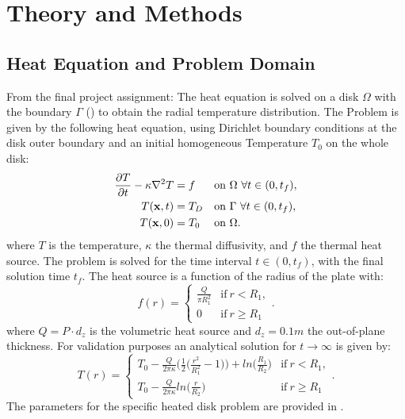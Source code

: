\section{Theory and Methods}

\subsection{Heat Equation and Problem Domain}

From the final project assignment:
The heat equation is solved on a disk $\Omega$ with the boundary $\Gamma$ () to obtain the radial temperature distribution. The Problem is given by the following heat equation, using Dirichlet boundary conditions at the disk outer boundary and an initial homogeneous Temperature $T_0$ on the whole disk:
\begin{align}
	\label{eq:Heat}
	\pp{T}{t}-\kappa \nabla^2 T &= f &&\text{on} \ \Omega \ \forall t \in (0,t_f),\\
	T(\vect{x},t) &= T_D &&\text{on} \ \Gamma \ \forall t \in (0,t_f), \label{eq:Dirichlet}\\
	T(\vect{x},0) &= T_0 &&\text{on} \ \Omega.
\end{align}
where $T$ is the temperature, $\kappa$ the thermal diffusivity, and $f$ the thermal heat source. The problem is solved for the time interval $t \in (0,t_f)$, with the final solution time $t_f$. The heat source is a function of the radius of the plate with:
\begin{equation}
	f(r) = \left\{\begin{array}{ll}\frac{Q}{\pi R_1^2} & \text{if} \ r < R_1, \\
		0 & \text{if} \ r \geq R_1 \end{array}\right . .
\end{equation}
where $Q=P \cdot d_z$ is the volumetric heat source and $d_z = 0.1m $ the out-of-plane thickness. For validation purposes an analytical solution for $t \rightarrow \infty$ is given by:
\begin{equation}
	\label{eq:analytical}
	T(r) = \left\{\begin{array}{ll} T_0-\frac{Q}{2 \pi \kappa } \big(\frac{1}{2} \big(\frac{r^2}{R_1^2} - 1\big)\big)+ln\big(\frac{R_1}{R_2}\big) & \text{if} \ r < R_1, \\
		T_0 - \frac{Q}{2 \pi \kappa } ln\big(\frac{r}{R_2}\big)& \text{if} \ r \geq R_1 \end{array}\right . .
\end{equation}
The parameters for the specific heated disk problem are provided in .
